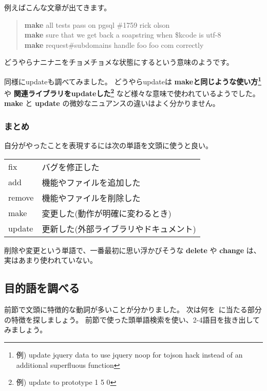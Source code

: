 \documentclass{jarticle}
\begin{document}
   例えばこんな文章が出てきます。
   \begin{quote}
    {\bf make} all tests pass on pgsql \#1759 rick olson\\
    {\bf make} sure that we get back a soapstring when \$kcode is utf-8\\
    {\bf make} request\#subdomains handle foo foo com correctly\\
   \end{quote}
   どうやらナニナニをチョメチョメな状態にするという意味のようです。

   同様にupdateも調べてみました。
   どうやらupdateは
   {\bf makeと同じような使い方{\footnote{例) update jquery data to use jquery noop for tojson hack instead of an additional superfluous function}}} や
   {\bf 関連ライブラリをupdateした{\footnote{例) update to prototype 1 5
   0 }}} など様々な意味で使われているようでした。
   {\bf make} と {\bf update} の微妙なニュアンスの違いはよく分かりません。

  \subsubsection{まとめ}
  自分がやったことを表現するには次の単語を文頭に使うと良い。
  \begin{table}[htbp]
   \begin{center}
    \begin{tabular}{ll}
     fix & バグを修正した \\
     add & 機能やファイルを追加した \\
     remove & 機能やファイルを削除した \\
     make & 変更した(動作が明確に変わるとき) \\
     update & 更新した(外部ライブラリやドキュメント) \\
    \end{tabular}
   \end{center}
  \end{table}

  削除や変更という単語で、一番最初に思い浮かびそうな {\bf delete} や {\bf change} は、
  実はあまり使われていない。

  \subsection{目的語を調べる}
  前節で文頭に特徴的な動詞が多いことが分かりました。
  次は何を~に当たる部分の特徴を探しましょう。
  前節で使った頭単語検索を使い、2-4語目を抜き出してみましょう。
\end{document}
